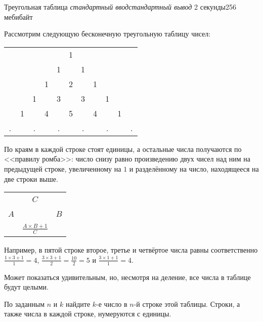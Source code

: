 
\gdef\thisproblemauthor{Иван Казменко}
\begin{problem}{Треугольная таблица}
{\textsl{стандартный ввод}}{\textsl{стандартный вывод}}
{2 секунды}{256 мебибайт}{}

Рассмотрим следующую бесконечную треугольную таблицу чисел:

\begin{center}
\begin{tabular}{c c c c c c c c c c c}
~ & ~ & ~ & ~ & ~ & 1 & ~ & ~ & ~ & ~ & ~ \\
~ & ~ & ~ & ~ & 1 & ~ & 1 & ~ & ~ & ~ & ~ \\
~ & ~ & ~ & 1 & ~ & 2 & ~ & 1 & ~ & ~ & ~ \\
~ & ~ & 1 & ~ & 3 & ~ & 3 & ~ & 1 & ~ & ~ \\
~ & 1 & ~ & 4 & ~ & 5 & ~ & 4 & ~ & 1 & ~ \\
. & ~ & . & ~ & . & ~ & . & ~ & . & ~ & . \\
\end{tabular}
\end{center}

По краям в каждой строке стоят единицы, а остальные числа получаются
по <<правилу ромба>>: число снизу равно произведению двух чисел над ним
на предыдущей строке, увеличенному на $1$ и разделённому на число,
находящееся на две строки выше.

\begin{center}
\begin{tabular}{c c c}
~ & $C$ & ~ \\
$A$ & ~ & $B$ \\
~ & {\Large $\frac{A \times B + 1}{C}$} & ~ \\
\end{tabular}
\end{center}

Например, в пятой строке второе, третье и четвёртое числа равны соответственно
$\frac{1 \times 3 + 1}{1} = 4$,
$\frac{3 \times 3 + 1}{2} = \frac{10}{2} = 5$ и
$\frac{3 \times 1 + 1}{1} = 4$.

Может показаться удивительным, но, несмотря на деление,
все числа в таблице будут целыми.

По заданным $n$ и $k$ найдите $k$-е число в $n$-й строке этой таблицы.
Строки, а также числа в каждой строке, нумеруются с единицы.


\end{problem}
